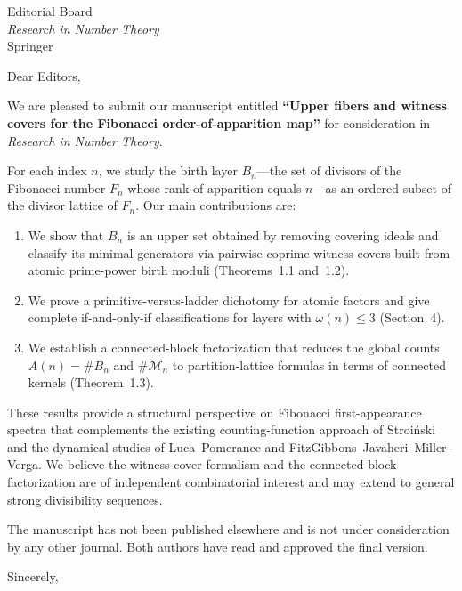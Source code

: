 \documentclass[11pt]{letter}
\date{\today}
\begin{document}
\begin{letter}{%
Editorial Board\\
\emph{Research in Number Theory}\\
Springer}

\opening{Dear Editors,}

We are pleased to submit our manuscript entitled \textbf{``Upper fibers and
witness covers for the Fibonacci order-of-apparition map''} for
consideration in \emph{Research in Number Theory}.

For each index $n$, we study the birth layer $B_n$---the set of divisors of
the Fibonacci number $F_n$ whose rank of apparition equals $n$---as an
ordered subset of the divisor lattice of $F_n$. Our main contributions are:

\begin{enumerate}
\item We show that $B_n$ is an upper set obtained by removing covering
ideals and classify its minimal generators via pairwise coprime witness
covers built from atomic prime-power birth moduli (Theorems~1.1 and~1.2).

\item We prove a primitive-versus-ladder dichotomy for atomic factors and
give complete if-and-only-if classifications for layers with
$\omega(n)\le 3$ (Section~4).

\item We establish a connected-block factorization that reduces the global
counts $A(n)=\#B_n$ and $\#\mathcal{M}_n$ to partition-lattice formulas in
terms of connected kernels (Theorem~1.3).
\end{enumerate}

These results provide a structural perspective on Fibonacci first-appearance
spectra that complements the existing counting-function approach of
Stroi\'nski and the dynamical studies of Luca--Pomerance and
FitzGibbons--Javaheri--Miller--Verga. We believe the witness-cover formalism
and the connected-block factorization are of independent combinatorial
interest and may extend to general strong divisibility sequences.

The manuscript has not been published elsewhere and is not under
consideration by any other journal. Both authors have read and approved the
final version.

\closing{Sincerely,}

\end{letter}
\end{document}
